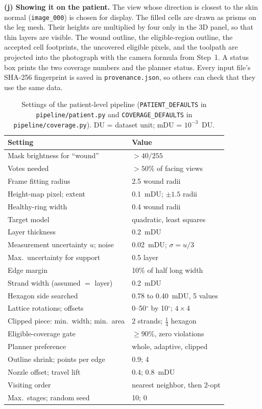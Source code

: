\documentclass[conference]{IEEEtran}
\begin{document}
\textbf{(j) Showing it on the patient.} The view whose direction is closest
to the skin normal (\texttt{image\_000}) is chosen for display. The filled
cells are drawn as prisms on the leg mesh. Their heights are
multiplied by four only in the 3D panel, so that thin layers are visible.
The wound outline, the eligible-region outline, the accepted cell
footprints, the uncovered eligible pixels, and the toolpath are projected
into the photograph with the camera formula from Step~1. A status box
prints the two coverage numbers and the planner status. Every input file's
SHA-256 fingerprint is saved in \texttt{provenance.json}, so others can
check that they use the same data.

\begin{table}[t]
\caption{Settings of the patient-level pipeline
(\texttt{PATIENT\_DEFAULTS} in \texttt{pipeline/patient.py} and
\texttt{COVERAGE\_DEFAULTS} in \texttt{pipeline/coverage.py}). DU = dataset
unit; mDU = $10^{-3}$~DU.}
\label{tab:patientparams}
\footnotesize
\begin{tabularx}{\columnwidth}{@{}Xl@{}}
\toprule
Setting & Value \\
\midrule
Mask brightness for ``wound'' & $>40/255$ \\
Votes needed & $>50\%$ of facing views \\
Frame fitting radius & 2.5 wound radii \\
Height-map pixel; extent & 0.1~mDU; $\pm1.5$ radii \\
Healthy-ring width & 0.4 wound radii \\
Target model & quadratic, least squares \\
Layer thickness & 0.2~mDU \\
Measurement uncertainty $u$; noise & 0.02~mDU; $\sigma=u/3$ \\
Max.\ uncertainty for support & 0.5 layer \\
Edge margin & 10\% of half long width \\
Strand width (assumed $=$ layer) & 0.2~mDU \\
Hexagon side searched & 0.78 to 0.40~mDU, 5 values \\
Lattice rotations; offsets & 0--50$^\circ$ by 10$^\circ$; $4\times4$ \\
Clipped piece: min.\ width; min.\ area & 2 strands; $\tfrac14$ hexagon \\
Eligible-coverage gate & $\ge90\%$, zero violations \\
Planner preference & whole, adaptive, clipped \\
Outline shrink; points per edge & 0.9; 4 \\
Nozzle offset; travel lift & 0.4; 0.8~mDU \\
Visiting order & nearest neighbor, then 2-opt \\
Max.\ stages; random seed & 10; 0 \\
\bottomrule
\end{tabularx}
\end{table}
\end{document}
